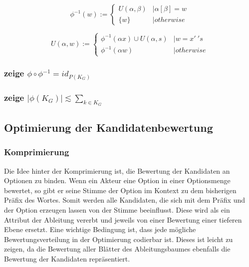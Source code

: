 \documentclass[]{article}
\begin{document}
\[ 
  \phi^{-1}(w) := 
  \begin{cases}
    U(\alpha, \beta) &| \alpha [ \beta ] = w \\
    \{ w \}   &| otherwise
  \end{cases}
\] 

\[ 
  U( \alpha, w ):= 
  \begin{cases}
    \phi^{-1}(\alpha x) \cup U(\alpha,s) &| w = x '\ ' s \\
    \phi^{-1}(\alpha w) &|otherwise
  \end{cases}
\] 

\subsubsection*{zeige $\phi\circ\phi^{-1} = id_{P(K_G)}$}
  

\subsubsection*{zeige $|\phi(K_G)| \lesssim \sum_{k\in K_G}$}



\subsection{Optimierung der Kandidatenbewertung}

\subsubsection*{Komprimierung}
Die Idee hinter der Komprimierung ist, die Bewertung der Kandidaten an Optionen zu binden. Wenn ein Akteur eine Option in einer Optionsmenge bewertet, so gibt er seine Stimme der Option im Kontext zu dem bisherigen Präfix des Wortes. Somit werden alle Kandidaten, die sich mit dem Präfix und der Option erzeugen lassen von der Stimme beeinflusst. Diese wird als ein Attribut der Ableitung vererbt\cite{Knuth1968} und jeweils von einer Bewertung einer tieferen Ebene ersetzt. Eine wichtige Bedingung ist, dass jede mögliche Bewertungsverteilung in der Optimierung codierbar ist. Dieses ist leicht zu zeigen, da die Bewertung aller Blätter des Ableitungsbaumes ebenfalls die Bewertung der Kandidaten repräsentiert.

\end{document}
